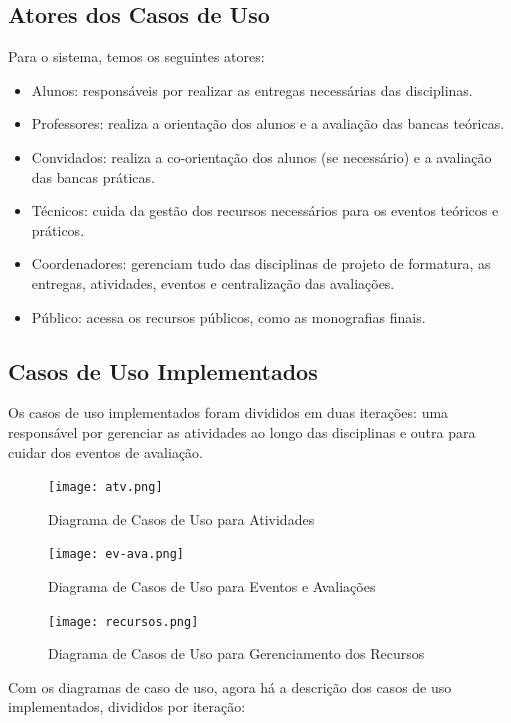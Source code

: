 \subsection{Atores dos Casos de Uso}
Para o sistema, temos os seguintes atores:

\begin{itemize}
    \item Alunos: responsáveis por realizar as entregas necessárias das disciplinas.
    \item Professores: realiza a orientação dos alunos e a avaliação das bancas teóricas.
    \item Convidados: realiza a co-orientação dos alunos (se necessário) e a avaliação das bancas práticas.
    \item Técnicos: cuida da gestão dos recursos necessários para os eventos teóricos e práticos.
    \item Coordenadores: gerenciam tudo das disciplinas de projeto de formatura, as entregas, atividades, eventos e centralização das avaliações.
    \item Público: acessa os recursos públicos, como as monografias finais.
\end{itemize}

\subsection{Casos de Uso Implementados}
Os casos de uso implementados foram divididos em duas iterações: uma responsável por gerenciar as atividades ao longo das disciplinas e outra para cuidar dos eventos de avaliação.

\begin{figure}[H]
    \centering
    \texttt{[image: atv.png]}
    \caption{Diagrama de Casos de Uso para Atividades}
    \label{fig:use-case-atv}
\end{figure}

\begin{figure}[H]
    \centering
    \texttt{[image: ev-ava.png]}
    \caption{Diagrama de Casos de Uso para Eventos e Avaliações}
    \label{fig:use-case-ev-ava}
\end{figure}

\begin{figure}[H]
    \centering
    \texttt{[image: recursos.png]}
    \caption{Diagrama de Casos de Uso para Gerenciamento dos Recursos}
    \label{fig:use-case-recursos}
\end{figure}

Com os diagramas de caso de uso, agora há a descrição dos casos de uso implementados, divididos por iteração:

